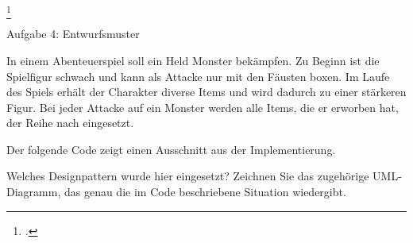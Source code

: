 \documentclass{bschlangaul-aufgabe}
\begin{document}
\index{}
\footcite{examen:46116:2017:03}

Aufgabe 4: Entwurfsmuster

In einem Abenteuerspiel soll ein Held Monster bekämpfen. Zu Beginn ist
die Spielfigur schwach und kann als Attacke nur mit den Fäusten boxen.
Im Laufe des Spiels erhält der Charakter diverse Items und wird dadurch
zu einer stärkeren Figur. Bei jeder Attacke auf ein Monster werden alle
Items, die er erworben hat, der Reihe nach eingesetzt.

Der folgende Code zeigt einen Ausschnitt aus der Implementierung.

Welches Designpattern wurde hier eingesetzt? Zeichnen Sie das zugehörige
UML-Diagramm, das genau die im Code beschriebene Situation wiedergibt.
\end{document}
